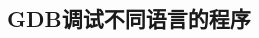 \documentclass[class=book, crop=false]{standalone}
\begin{document}
\begin{CJK}{UTF8}{gbsn}

\chapter{GDB调试不同语言的程序}













\cleardoublepage

\end{CJK}
\end{document}
